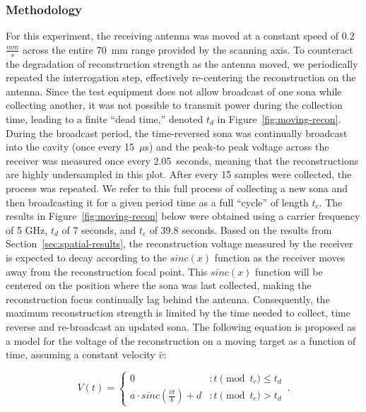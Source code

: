 \subsubsection{Methodology}
For this experiment, the receiving antenna was moved at a constant speed of 0.2~$\frac{mm}{s}$ across the entire 70~mm range provided by the scanning axis. To counteract the degradation of reconstruction strength as the antenna moved, we periodically repeated the interrogation step, effectively re-centering the reconstruction on the antenna. Since the test equipment does not allow broadcast of one sona while collecting another, it was not possible to transmit power during the collection time, leading to a finite ``dead time,'' denoted $t_d$ in Figure~\ref{fig:moving-recon}. During the broadcast period, the time-reversed sona was continually broadcast into the cavity (once every 15~$\mu$s) and the peak-to peak voltage across the receiver was measured once every 2.05~seconds, meaning that the reconstructions are highly undersampled in this plot. After every 15 samples were collected, the process was repeated. We refer to this full process of collecting a new sona and then broadcasting it for a given period time as a full ``cycle'' of length $t_c$. The results in Figure~\ref{fig:moving-recon}  below were obtained using a carrier frequency of 5 GHz, $t_d$ of 7 seconds, and $t_c$ of 39.8 seconds. Based on the results from Section~\ref{sec:spatial-results}, the \ptp{} reconstruction voltage measured by the receiver is expected to decay according to the $sinc(x)$ function as the receiver
moves away from the reconstruction focal point. This $sinc(x)$ function will be centered on the position where the sona was last collected, making the reconstruction focus continually lag behind the antenna. Consequently, the maximum reconstruction strength is limited by the time needed to collect, time reverse and re-broadcast an updated sona. The following equation is proposed as a model for the \ptp{} voltage of the reconstruction on a moving target as a
function of time, assuming a constant velocity $\bar{v}$:

\begin{equation}\label{eq:vt}
  V(t) = \left\{
        \begin{array}{ll}
                0 & : t\pmod{t_c} \le t_d \\
                a\cdot sinc(\frac{\bar{v}t}{b})+d & : t\pmod{t_c} > t_d
        \end{array}\,.
  \right.
\end{equation}

